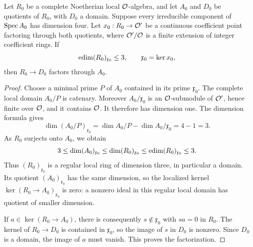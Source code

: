 \begin{lemma}\label{lem:regular-support}
Let $R_0$ be a complete Noetherian local $\mathcal O$-algebra, and let
$A_0$ and $D_0$ be quotients of $R_0$, with $D_0$ a domain.
Suppose every irreducible component of $\operatorname{Spec} A_0$ has dimension
four.  Let $x_0:R_0\to\mathcal O'$ be a continuous coefficient point
factoring through both quotients, where $\mathcal O'/\mathcal O$ is a finite
extension of integer coefficient rings.  If
\[
 \operatorname{edim}(R_0)_{\mathfrak x_0}\leq3,
 \qquad \mathfrak x_0=\ker x_0,
\]
then $R_0\to D_0$ factors through $A_0$.
\end{lemma}

\begin{proof}
Choose a minimal prime $P$ of $A_0$ contained in its prime
$\mathfrak x_0$.  The complete local domain $A_0/P$ is
catenary.  Moreover $A_0/\mathfrak x_0$ is an $\mathcal O$-submodule
of $\mathcal O'$, hence finite over $\mathcal O$, and it contains $\mathcal O$.
It therefore has dimension one.  The dimension formula gives
\[
 \dim(A_0/P)_{\mathfrak x_0}
 =\dim A_0/P-\dim A_0/\mathfrak x_0=4-1=3.
\]
As $R_0$ surjects onto $A_0$, we obtain
\[
 3\leq\dim (A_0)_{\mathfrak x_0}
 \leq\dim (R_0)_{\mathfrak x_0}
 \leq\operatorname{edim} (R_0)_{\mathfrak x_0}\leq3.
\]
Thus $(R_0)_{\mathfrak x_0}$ is a regular local ring of dimension
three, in particular a domain.  Its quotient
$(A_0)_{\mathfrak x_0}$ has the same dimension, so the localized
kernel $\ker(R_0\to A_0)_{\mathfrak x_0}$ is zero: a nonzero
ideal in this regular local domain has quotient of smaller
dimension.

If $a\in\ker(R_0\to A_0)$, there is consequently
$s\notin\mathfrak x_0$ with $sa=0$ in $R_0$.
The kernel of $R_0\to D_0$ is contained in $\mathfrak x_0$,
so the image of $s$ in $D_0$ is nonzero.  Since $D_0$ is a
domain, the image of $a$ must vanish.  This proves the factorization.
\end{proof}

